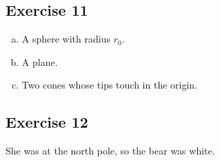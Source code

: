 \documentclass[11pt]{article}
\begin{document}
\subsection{Exercise 11}

\begin{enumerate}[a.]
	\item A sphere with radius $r_0$.
	\item A plane.
	\item Two cones whose tips touch in the origin.
\end{enumerate}


\subsection{Exercise 12}

She was at the north pole, so the bear was white.
\end{document}
